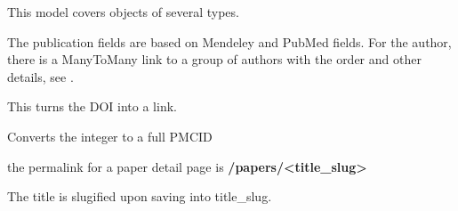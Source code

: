 \documentclass[letterpaper,10pt,english]{sphinxmanual}
\begin{document}

\begin{fulllineitems}
\label{papers:papers.models.Publication}
This model covers {\hyperref[papers:papers.models.Publication]{}} objects of several types.

The publication fields are based on Mendeley and PubMed fields.
For the author, there is a ManyToMany link to a group of authors with the order and other details, see {\hyperref[papers:papers.models.AuthorDetails]{}}.

\begin{fulllineitems}
\label{papers:papers.models.Publication.doi_link}
This turns the DOI into a link.

\end{fulllineitems}


\begin{fulllineitems}
\label{papers:papers.models.Publication.full_pmcid}
Converts the integer to a full PMCID

\end{fulllineitems}


\begin{fulllineitems}
\label{papers:papers.models.Publication.get_absolute_url}
the permalink for a paper detail page is \textbf{/papers/\textless{}title\_slug\textgreater{}}

\end{fulllineitems}


\begin{fulllineitems}
\label{papers:papers.models.Publication.save}
The title is slugified upon saving into title\_slug.

\end{fulllineitems}


\end{fulllineitems}
\end{document}
